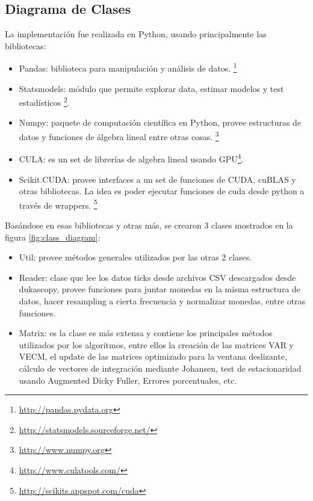 \subsection{Diagrama de Clases}
La implementación fue realizada en Python, usando principalmente las bibliotecas:
\begin{itemize}
 \item Pandas: biblioteca para manipulación y análisis de datos.
\footnote{\url{http://pandas.pydata.org}}
 \item Statsmodels: módulo que permite explorar data, estimar modelos y test
estadísticos \footnote{\url{http://statsmodels.sourceforge.net/}}.
 \item Numpy: paquete de computación científica en Python, provee estructuras
de datos y funciones de álgebra lineal entre otras cosas.
\footnote{\url{http://www.numpy.org}}
 \item CULA: es un set de librerías de algebra lineal usando
GPU\footnote{\url{http://www.culatools.com/}}.
 \item Scikit.CUDA: provee interfaces a un set de funciones de CUDA, cuBLAS y
otras bibliotecas. La idea es poder ejecutar funciones de cuda desde python a
través de wrappers. \footnote{\url{http://scikits.appspot.com/cuda}}
\end{itemize}

Basándose en esas bibliotecas y otras más, se crearon 3 clases mostrados en la
figura \ref{fig:class_diagram}:
\begin{itemize}
 \item Util: provee métodos generales utilizados por las otras 2 clases.
 \item Reader: clase que lee los datos ticks desde archivos CSV descargados
desde dukascopy, provee funciones para juntar monedas en la misma estructura de
datos, hacer resampling a cierta frecuencia y normalizar monedas, entre otras
funciones.
 \item Matrix: es la clase es más extensa y contiene los principales métodos
utilizados por los algoritmos, entre ellos la creación de las matrices VAR y
VECM, el update de las matrices optimizado para la ventana deslizante, cálculo
de vectores de integración mediante Johansen, test de estacionaridad usando
Augmented Dicky Fuller, Errores porcentuales, etc.
\end{itemize}

